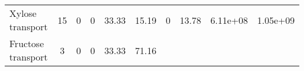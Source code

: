 \documentclass[]{article}
\begin{document}
\begin{longtable}[]{@{}lccccccccc@{}}
\begin{minipage}[t]{0.07\columnwidth}
Xylose transport\strut
\end{minipage} & \begin{minipage}[t]{0.06\columnwidth}\centering\strut
15\strut
\end{minipage} & \begin{minipage}[t]{0.08\columnwidth}\centering\strut
0\strut
\end{minipage} & \begin{minipage}[t]{0.08\columnwidth}\centering\strut
0\strut
\end{minipage} & \begin{minipage}[t]{0.08\columnwidth}\centering\strut
33.33\strut
\end{minipage} & \begin{minipage}[t]{0.08\columnwidth}\centering\strut
15.19\strut
\end{minipage} & \begin{minipage}[t]{0.08\columnwidth}\centering\strut
0\strut
\end{minipage} & \begin{minipage}[t]{0.08\columnwidth}\centering\strut
13.78\strut
\end{minipage} & \begin{minipage}[t]{0.08\columnwidth}\centering\strut
6.11e+08\strut
\end{minipage} & \begin{minipage}[t]{0.08\columnwidth}\centering\strut
1.05e+09\strut
\end{minipage}\tabularnewline
\begin{minipage}[t]{0.07\columnwidth}\raggedright\strut
Fructose transport\strut
\end{minipage} & \begin{minipage}[t]{0.06\columnwidth}\centering\strut
3\strut
\end{minipage} & \begin{minipage}[t]{0.08\columnwidth}\centering\strut
0\strut
\end{minipage} & \begin{minipage}[t]{0.08\columnwidth}\centering\strut
0\strut
\end{minipage} & \begin{minipage}[t]{0.08\columnwidth}\centering\strut
33.33\strut
\end{minipage} & \begin{minipage}[t]{0.08\columnwidth}\centering\strut
71.16\strut
\end{minipage} & \begin{minipage}[t]{0.08\columnwidth}\centering\strut

\end{minipage}
\end{longtable}
\end{document}
